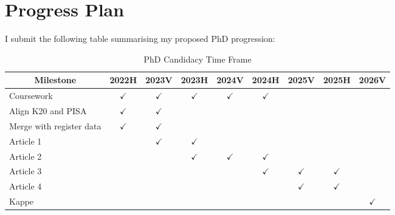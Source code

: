 \documentclass[
    a4paper,                %
    11pt,                   %
    stu,                    %
    donotrepeattitle,       %
    floatsintext,           %
    biblatex,               %
    colorlinks=true,        %
    linkcolor=red,          %
    anchorcolor=black,      %
    citecolor=blue,         %
    urlcolor=blue,          %
    bookmarks=true,         %
    bookmarksopen=false,    %
    bookmarksnumbered=true, %
    dvipsnames              %
]{apa7}
\begin{document}
\section{Progress Plan}

I submit the following table summarising my proposed PhD progression:

\begin{table}[htbp]
    \begin{threeparttable}
    \caption{PhD Candidacy Time Frame}
    \label{tab:timeframe}
    \begin{tabular}{lcccccccc}
        \toprule
        \multicolumn{1}{c}{Milestone} & 2022H & 2023V & 2023H & 2024V & 2024H & 2025V & 2025H & 2026V \\
        \midrule
        Coursework & $\checkmark$     & $\checkmark$     & $\checkmark$     & $\checkmark$      & $\checkmark$      &       &       &  \\
        Align K20 and PISA & $\checkmark$     & $\checkmark$       &       &       &       &       &       &  \\
        Merge with register data & $\checkmark$     & $\checkmark$     &       &       &       &       &       &  \\
        Article 1 &       & $\checkmark$     & $\checkmark$     &       &       &       &       &  \\
        Article 2 &       &       & $\checkmark$     & $\checkmark$     & $\checkmark$     &       &       &  \\
        Article 3 &       &       &       &       & $\checkmark$     & $\checkmark$     & $\checkmark$     &  \\
        Article 4 &       &       &       &       &       & $\checkmark$     & $\checkmark$     &  \\
        Kappe &       &       &       &       &       &       &       & $\checkmark$ \\
        \bottomrule
        \end{tabular}
    \end{threeparttable}
\end{table}

\printbibliography
\end{document}
